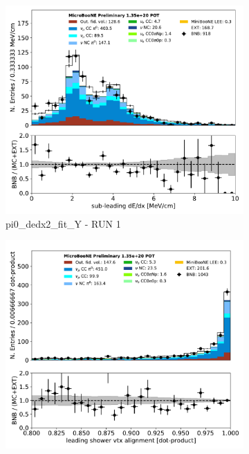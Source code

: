 \documentclass[a4paper]{article}
\begin{document}
\begin{figure}[H] 
\begin{center}
    \begin{subfigure}[b]{0.3\textwidth}
    \centering
    \includegraphics[width=1.00\textwidth]{pi0/pi0_dedx2_fit_Y_01152020_inputs_RUN1.pdf}
    \caption{\label{fig:pi0:inputs:dedx2:RUN1} pi0\_dedx2\_fit\_Y - RUN 1 }
    \end{subfigure}
    \begin{subfigure}[b]{0.3\textwidth}
    \centering
    \includegraphics[width=1.00\textwidth]{pi0/pi0_dot1_01152020_inputs_RUN1.pdf}

\end{subfigure}
\end{center}
\end{figure}
\end{document}
